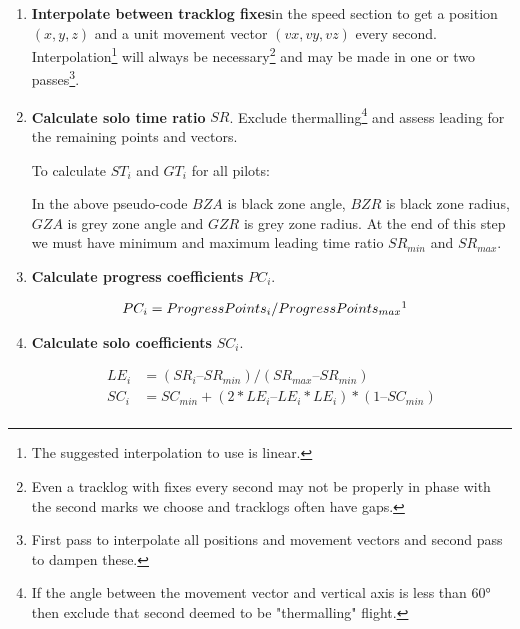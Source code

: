 \documentclass[gap.tex]{subfiles}
\begin{document}
\begin{enumerate}
    \item \textbf{Interpolate between tracklog fixes}\footnotemark in the speed
        section to get a position \((x, y, z)\) and a unit movement vector
        \((vx, vy, vz)\) every second. Interpolation\footnote{The
        suggested interpolation to use is linear.} will always be
        necessary\footnote{Even a tracklog with fixes every second may not be
        properly in phase with the second marks we choose and tracklogs often
        have gaps.} and may be made in one or two passes\footnote{First pass to
        interpolate all positions and movement vectors and second pass to
        dampen these.}.

    \item \textbf{Calculate solo time ratio} \(SR\). Exclude
        thermalling\footnote{If the angle between the movement vector and
        vertical axis is less than 60° then exclude that second deemed to be
        "thermalling" flight.} and assess leading for the remaining points and
        vectors.
    
        To calculate \(ST_i\) and \(GT_i\) for all pilots:

        In the above pseudo-code \(BZA\) is black zone angle, \(BZR\) is black
        zone radius, \(GZA\) is grey zone angle and \(GZR\) is grey zone
        radius. At the end of this step we must have minimum and maximum
        leading time ratio \(SR_{min}\) and \(SR_{max}\).

    \item \textbf{Calculate progress coefficients} \(PC_i\).
        
        \begin{align*}
            PC_i &= ProgressPoints_i / ProgressPoints_{max}\footnotemark
        \end{align*}

    \item \textbf{Calculate solo coefficients} \(SC_i\).
        
        \begin{align*}
            LE_i &= (SR_i – SR_{min}) / (SR_{max} – SR_{min}) \\
            SC_i &= SC_{min} + (2*LE_i – LE_i * LE_i) * (1 – SC_{min}) \\
        \end{align*}
            

\end{enumerate}
\end{document}
